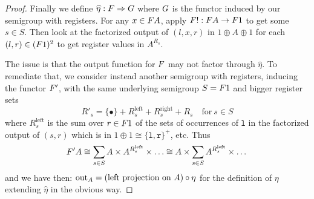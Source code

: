\documentclass[a4paper,UKenglish,cleveref, autoref, thm-restate, numberwithinsect]{lipics-v2021}
\begin{document}
\begin{proof}
    Finally we define $\widehat\eta : \functor \Rightarrow \functorg$ where $\functorg$ is the functor induced by our semigroup with registers. For any $x \in \functor A$, apply $\functor! : \functor A \to \functor 1$ to get some $s \in S$. Then look at the factorized output of $(l,x,r)$ in $1\oplus A \oplus 1$ for each $(l,r)\in (\functor1)^2$ to get register values in $A^{R_s}$.

    The issue is that the output function for $\functor$ may not factor through $\widehat\eta$. To remediate that, we consider instead another semigroup with registers, inducing the functor $\functor'$, with the same underlying semigroup $S=\functor1$ and bigger register sets
    \[ R'_s = \{\bullet\} + R^{\mathrm{left}}_s + R^{\mathrm{right}}_s + R_s \quad\text{for}\ s\in S\]
    where $R^{\mathrm{left}}_s$ is the sum over $r \in \functor1$ of the sets of occurrences of $\mathtt{l}$ in the factorized output of $(s,r)$ which is in $1\oplus1\cong\{\mathtt{l,r}\}^+$, etc. Thus
    \[ \functor'A \cong \sum_{s\in S} A \times A^{R^{\mathrm{left}}_s} \times \dots \cong A \times \sum_{s\in S} A^{R^{\mathrm{left}}_s} \times \dots \]
    and we have then: $\mathrm{out}_A = (\text{left projection on}\ A) \circ \eta$ for the definition of $\eta$ extending $\widehat\eta$ in the obvious way.
\end{proof}
\end{document}
